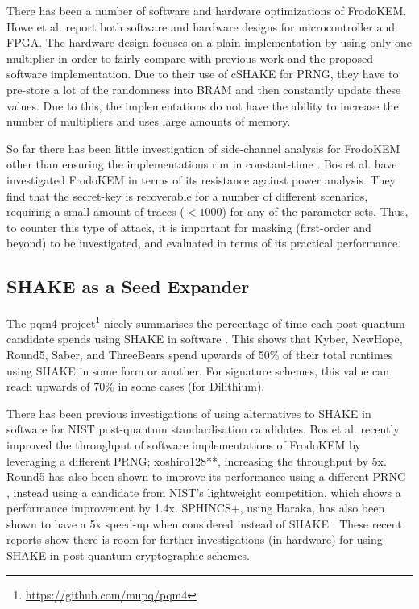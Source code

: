 There has been a number of software and hardware optimizations of FrodoKEM. Howe et al. \cite{howe2018standard} report both software and hardware designs for microcontroller and FPGA. The hardware design focuses on a plain implementation by using only one multiplier in order to fairly compare with previous work and the proposed software implementation. Due to their use of cSHAKE for PRNG, they have to pre-store a lot of the randomness into BRAM and then constantly update these values. Due to this, the implementations do not have the ability to increase the number of multipliers and uses large amounts of memory.

So far there has been little investigation of side-channel analysis for FrodoKEM other than ensuring the implementations run in constant-time \cite{howe2018standard}. Bos et al. \cite{bos2018assessing} have investigated FrodoKEM in terms of its resistance against power analysis. They find that the secret-key is recoverable for a number of different scenarios, requiring a small amount of traces ($<1000$) for any of the parameter sets. Thus, to counter this type of attack, it is important for masking (first-order and beyond) to be investigated, and evaluated in terms of its practical performance.

\subsection{SHAKE as a Seed Expander} \label{sec:shake}

The pqm4 project\footnote[1]{\url{https://github.com/mupq/pqm4}} nicely summarises the percentage of time each post-quantum candidate spends using SHAKE in software \cite[Section 5.3]{pqm4}. This shows that Kyber, NewHope, Round5, Saber, and ThreeBears spend upwards of 50\% of their total runtimes using SHAKE in some form or another. For signature schemes, this value can reach upwards of 70\% in some cases (for Dilithium).

There has been previous investigations of using alternatives to SHAKE in software for NIST post-quantum standardisation candidates. Bos et al. \cite{cryptoeprint:2018:1116} recently improved the throughput of software implementations of FrodoKEM by leveraging a different PRNG; xoshiro128**, increasing the throughput by 5x. Round5 has also been shown to improve its performance using a different PRNG \cite{cryptoeprint:2019:685}, instead using a candidate from NIST's lightweight competition, which shows a performance improvement by 1.4x. SPHINCS+, using Haraka, has also been shown to have a 5x speed-up when considered instead of SHAKE \cite{cryptoeprint:2019:1086}. These recent reports show there is room for further investigations (in hardware) for using SHAKE in post-quantum cryptographic schemes.


